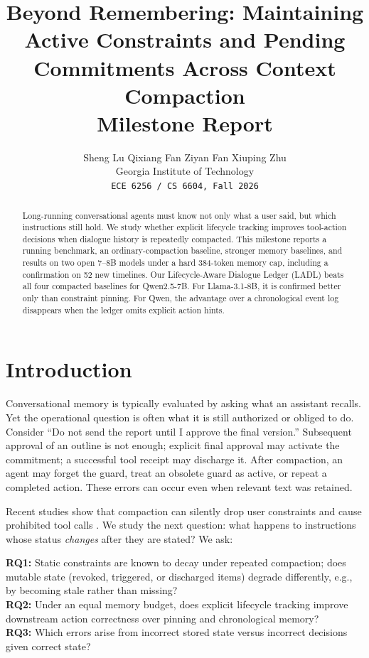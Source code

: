 \documentclass[11pt]{article}
\title{Beyond Remembering: Maintaining Active Constraints and Pending\\ Commitments Across Context Compaction\\ \large Milestone Report}
\author{Sheng Lu \quad Qixiang Fan \quad Ziyan Fan \quad Xiuping Zhu \\
  Georgia Institute of Technology \\
  \texttt{ECE 6256 / CS 6604, Fall 2026}}
\newcommand{\ours}{\textsc{LADL}\xspace}
\begin{document}
\maketitle

\begin{abstract}
Long-running conversational agents must know not only what a user said, but which instructions still hold. We study whether explicit lifecycle tracking improves tool-action decisions when dialogue history is repeatedly compacted. This milestone reports a running benchmark, an ordinary-compaction baseline, stronger memory baselines, and results on two open 7--8B models under a hard 384-token memory cap, including a confirmation on 52 new timelines. Our Lifecycle-Aware Dialogue Ledger (\ours) beats all four compacted baselines for Qwen2.5-7B. For Llama-3.1-8B, it is confirmed better only than constraint pinning. For Qwen, the advantage over a chronological event log disappears when the ledger omits explicit action hints.
\end{abstract}

\section{Introduction}

Conversational memory is typically evaluated by asking what an assistant recalls. Yet the operational question is often what it is still authorized or obliged to do. Consider ``Do not send the report until I approve the final version.'' Subsequent approval of an outline is not enough; explicit final approval may activate the commitment; a successful tool receipt may discharge it. After compaction, an agent may forget the guard, treat an obsolete guard as active, or repeat a completed action. These errors can occur even when relevant text was retained.

Recent studies show that compaction can silently drop user constraints and cause prohibited tool calls \citep{wang2026lost,chen2026governance,zerhoudi2026cliff}. We study the next question: what happens to instructions whose status \emph{changes} after they are stated? We ask:

\noindent\textbf{RQ1:} Static constraints are known to decay under repeated compaction; does mutable state (revoked, triggered, or discharged items) degrade differently, e.g., by becoming stale rather than missing?\\
\textbf{RQ2:} Under an equal memory budget, does explicit lifecycle tracking improve downstream action correctness over pinning and chronological memory?\\
\textbf{RQ3:} Which errors arise from incorrect stored state versus incorrect decisions given correct state?
\end{document}
